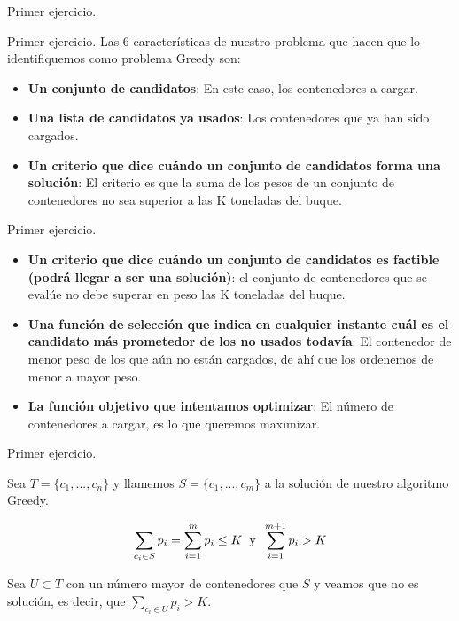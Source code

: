 \documentclass[10pt, xcolor=table]{beamer}
\begin{document}
\begin{frame}[fragile]{Primer ejercicio. }
	
\end{frame}

\begin{frame}[fragile]{Primer ejercicio. }
	Las 6 características de nuestro problema que hacen que lo identifiquemos como problema Greedy son:
	\begin{itemize}
		\item \textbf{Un conjunto de candidatos}: En este caso, los contenedores a cargar.
		\item \textbf{Una lista de candidatos ya usados}: Los contenedores que ya han sido cargados.
		\item \textbf{Un criterio que dice cuándo un conjunto de candidatos forma una solución}: El criterio es que la suma de los pesos de un conjunto de contenedores no sea superior a las K toneladas del buque.
	\end{itemize}
	
\end{frame}

\begin{frame}[fragile]{Primer ejercicio. }
	\begin{itemize}
		\item \textbf{Un criterio que dice cuándo un conjunto de candidatos es factible (podrá llegar a ser una solución)}: el conjunto de contenedores que se evalúe no debe superar en peso las K toneladas del buque.
		\item \textbf{Una función de selección que indica en cualquier instante cuál es el candidato más prometedor de los no usados todavía}: El contenedor de menor peso de los que aún no están cargados, de ahí que los ordenemos de menor a mayor peso.
		\item \textbf{La función objetivo que intentamos optimizar}: El número de contenedores a cargar, es lo que queremos maximizar.
	\end{itemize}
	
\end{frame}


\begin{frame}[fragile]{Primer ejercicio. }
	
	Sea $T = \lbrace c_{1},...,c_{n} \rbrace$ y llamemos $S = \lbrace c_{1},...,c_{m} \rbrace$ a la solución de nuestro algoritmo Greedy.
	
	\[
	\sum_{c_{i} \in S}p_{i} = \sum_{i = 1}^{m}p_{i} \leq  K \hspace{0.2cm} \text{y} \hspace{0.2cm} \sum_{i = 1}^{m+1}p_{i} > K
	\]
	
	Sea $U \subset T$ con un número mayor de contenedores que $S$ y veamos que no es solución, es decir, que $\sum_{c_{i} \in U}p_{i} > K$.
\end{frame}
\end{document}
